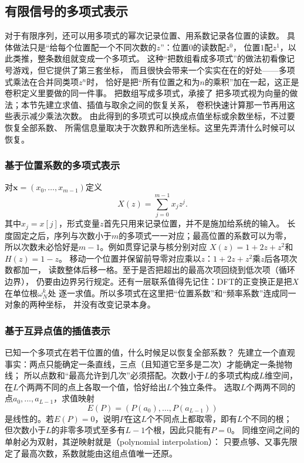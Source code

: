 \subsection{有限信号的多项式表示}
\label{sec:signal-analysis-polynomial-arithmetic}

对于有限序列，还可以用多项式的幂次记录位置、用系数记录各位置的读数。
具体做法只是“给每个位置配一个不同次数的$z$”：位置$0$的读数配$z^0$，
位置$1$配$z^1$，以此类推，整条数组就变成一个多项式。
这种“把数组看成多项式”的做法初看像记号游戏，但它提供了第三套坐标，
而且很快会带来一个实实在在的好处——多项式乘法在合并同类项$z^n$时，
恰好是把“所有位置之和为$n$的乘积”加在一起，这正是卷积定义里要做的同一件事。
把数组写成多项式，承接了
把多项式视为向量的做法；本节先建立求值、插值与取余之间的恢复关系，
卷积快速计算那一节再用这些表示减少乘法次数。
由此得到的多项式可以换成点值坐标或余数坐标，不过要恢复全部系数、
所需信息量取决于次数界和所选坐标。这里先弄清什么时候可以恢复。

\subsubsection{基于位置系数的多项式表示}

对$\bm x=(x_0,\ldots,x_{m-1})$定义
\[
  X(z)=\sum_{j=0}^{m-1}x_jz^j.
\]
其中$x_j=x[j]$，形式变量$z$首先只用来记录位置，并不是施加给系统的输入。
长度固定之后，序列与次数小于$m$的多项式一一对应；最高位置的系数可以为零，
所以次数未必恰好是$m-1$。例如贯穿记录与核分别对应
$X(z)=1+2z+z^2$和$H(z)=1-z$。
移动一个位置并保留前导零对应乘以$z$：$1+2z+z^2$乘$z$后各项次数都加一，
读数整体后移一格。至于是否把超出的最高次项回绕到低次项（循环边界），
仍要由边界另行规定。还有一层联系值得先记住：DFT的正变换正是把$X$在单位根$\omega_N^k$处
逐一求值。所以多项式在这里把“位置系数”和“频率系数”连成同一对象的两种坐标，
并没有改变记录本身。

\subsubsection{基于互异点值的插值表示}

已知一个多项式在若干位置的值，什么时候足以恢复全部系数？
先建立一个直观事实：两点只能确定一条直线，三点（且知道它至多是二次）才能确定一条抛物线；
所以点数和“最高允许到几次”必须搭配。次数小于$L$的多项式构成$L$维空间，
在$L$个两两不同的点上各取一个值，恰好给出$L$个独立条件。
选取$L$个两两不同的点$a_0,\ldots,a_{L-1}$，求值映射
\[
  E(P)=(P(a_0),\ldots,P(a_{L-1}))
\]
是线性的。若$E(P)=0$，说明$P$在这$L$个不同点上都取零，即有$L$个不同的根；
但次数小于$L$的非零多项式至多有$L-1$个根，因此只能有$P=0$。
同维空间之间的单射必为双射，其逆映射就是（polynomial interpolation）：
只要点够、又事先限定了最高次数，系数就能由这组点值唯一还原。

